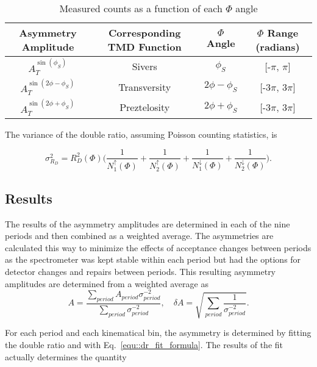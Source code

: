 \begin{table}[h!t]
  \centering
  \caption{Measured counts as a function of each $\Phi$ angle}
  \begin{tabular}{ |c|c|c|c| }
    \hline \textbf{Asymmetry Amplitude}& \textbf{Corresponding TMD Function}&
    \textbf{$\Phi$ Angle}& \textbf{$\Phi$ Range (radians)} \\ \hline
    
    $A^{\sin(\phi_S)}_T$& Sivers& $\phi_S$& [-$\pi$, $\pi$] \\ \hline

    $A^{\sin(2\phi-\phi_S)}_T$& Transversity& $2\phi-\phi_S$& [-3$\pi$, 3$\pi$]
    \\ \hline

    $A^{\sin(2\phi+\phi_S)}_T$& Preztelosity& $2\phi+\phi_S$& [-3$\pi$, 3$\pi$]
    \\ \hline
  \end{tabular}
    \label{tab::ratio_phiAngles}
\end{table}

The variance of the double ratio, assuming Poisson counting statistics, is

\begin{equation}
  \sigma^2_{R_D} = R^2_D(\Phi)\Big(\frac{1}{N_1^\uparrow(\Phi)}
    + \frac{1}{N_2^\uparrow(\Phi)}
    + \frac{1}{N_1^\downarrow(\Phi)}
    +\frac{1}{N_2^\downarrow(\Phi)}
   \Big).
\end{equation}

\subsection{Results}\label{sec::doubleratio_results}
The results of the asymmetry amplitudes are determined in each of the nine
periods and then combined as a weighted average.  The asymmetries are calculated
this way to minimize the effects of acceptance changes between periods as the
spectrometer was kept stable within each period but had the options for detector
changes and repairs between periods.  This resulting asymmetry amplitudes are
determined from a weighted average as
\begin{equation}
  \label{equ::wAvg}
  A = \frac{
    \sum_{period}
  A_{period}\sigma^{-2}_{period}
  }{
    \sum_{period} \sigma^{-2}_{period}
    },
  \quad \delta A = \sqrt{\sum_{period}
  \frac{1}{\sigma^{-2}_{period}}}.
\end{equation}

For each period and each kinematical bin, the asymmetry is determined by fitting
the double ratio and with Eq.~\ref{equ::dr_fit_formula}.  The results of the fit
actually determines the quantity

